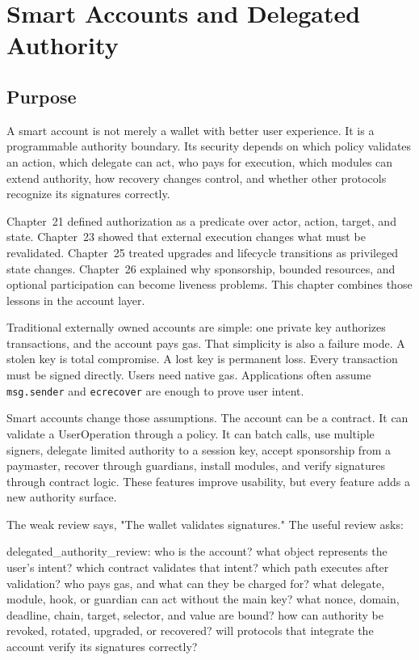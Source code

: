 \chapter{Smart Accounts and Delegated Authority}

\section{Purpose}

\begin{principlebox}
A smart account is not merely a wallet with better user experience. It is a programmable authority boundary. Its security depends on which policy validates an action, which delegate can act, who pays for execution, which modules can extend authority, how recovery changes control, and whether other protocols recognize its signatures correctly.
\end{principlebox}

Chapter~21 defined authorization as a predicate over actor, action, target, and state. Chapter~23 showed that external execution changes what must be revalidated. Chapter~25 treated upgrades and lifecycle transitions as privileged state changes. Chapter~26 explained why sponsorship, bounded resources, and optional participation can become liveness problems. This chapter combines those lessons in the account layer.

Traditional externally owned accounts are simple: one private key authorizes transactions, and the account pays gas. That simplicity is also a failure mode. A stolen key is total compromise. A lost key is permanent loss. Every transaction must be signed directly. Users need native gas. Applications often assume \texttt{msg.sender} and \texttt{ecrecover} are enough to prove user intent.

Smart accounts change those assumptions. The account can be a contract. It can validate a UserOperation through a policy. It can batch calls, use multiple signers, delegate limited authority to a session key, accept sponsorship from a paymaster, recover through guardians, install modules, and verify signatures through contract logic. These features improve usability, but every feature adds a new authority surface.

The weak review says, "The wallet validates signatures." The useful review asks:

\begin{codeblock}
delegated_authority_review:
    who is the account?
    what object represents the user's intent?
    which contract validates that intent?
    which path executes after validation?
    who pays gas, and what can they be charged for?
    what delegate, module, hook, or guardian can act without the main key?
    what nonce, domain, deadline, chain, target, selector, and value are bound?
    how can authority be revoked, rotated, upgraded, or recovered?
    will protocols that integrate the account verify its signatures correctly?
\end{codeblock}

